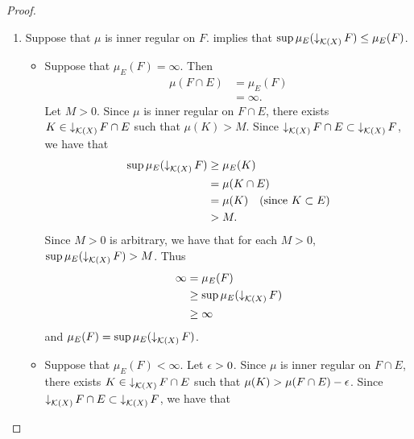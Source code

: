 \documentclass{book}
\begin{document}
\begin{proof}
\begin{enumerate}
\begin{itemize}
\begin{align*}
					& = \mu_E(U_0) \\
					& \leq \mu(U_0) \\
					& < \mu(F \cap E) + \ep \\
					& = \mu_E(F) + \ep.
				\end{align*}
				Since $\ep > 0$ is arbitrary, we have that for each $\ep > 0$, $\inf \mu_E( \upar_{\MO(X)} F) < \mu_E(F) + \ep$. Hence 
				\begin{align*}
					\inf \mu_E( \upar_{\MO(X)} F) 
					& \leq \mu_E(F) \\
					& \leq \inf \mu_E( \upar_{\MO(X)} F) 
				\end{align*}
				and $\mu_E(F) = \inf \mu_E( \upar_{\MO(X)} F)$. 
			\end{itemize}
			Thus $\mu_E$ is outer regular on $F$.
			\item Suppose that $\mu$ is inner regular on $F$.  implies that $\sup \mu_E(\operatorname{\downarrow}_{\mathcal{K}(X)}F) \leq \mu_E(F)$.
			\begin{itemize}
				\item Suppose that $\mu_E(F) = \infty$. Then 
				\begin{align*}
					\mu(F \cap E)
					& = \mu_E(F) \\
					& = \infty.
				\end{align*}
				Let $M > 0$. Since $\mu$ is inner regular on $F \cap E$, there exists $K \in \operatorname{\downarrow}_{\mathcal{K}(X)} F \cap E$ such that $\mu(K) > M$. Since $\operatorname{\downarrow}_{\mathcal{K}(X)} F \cap E \subset \operatorname{\downarrow}_{\mathcal{K}(X)} F $, we have that 
				\begin{align*}
					\sup \mu_E(\operatorname{\downarrow}_{\mathcal{K}(X)} F) 
					& \geq \mu_E(K) \\
					& = \mu(K \cap E) \\
					& = \mu(K) \quad \text{(since $K \subset E$)} \\
					& > M.
				\end{align*}
				Since $M > 0$ is arbitrary, we have that for each $M > 0$, $\sup \mu_E(\operatorname{\downarrow}_{\mathcal{K}(X)} F) > M$. Thus 
				\begin{align*}
					\infty 
					& = \mu_E(F) \\
					& \geq \sup \mu_E(\operatorname{\downarrow}_{\mathcal{K}(X)} F) \\
					& \geq \infty
				\end{align*}   
				and $\mu_E(F) = \sup \mu_E(\operatorname{\downarrow}_{\mathcal{K}(X)} F)$.
				\item Suppose that $\mu_E(F) < \infty$. Let $\ep > 0$. Since $\mu$ is inner regular on $F \cap E$, there exists $K \in \operatorname{\downarrow}_{\mathcal{K}(X)} F \cap E$ such that $\mu(K) > \mu(F \cap E) - \epsilon$. Since $\operatorname{\downarrow}_{\mathcal{K}(X)} F \cap E \subset \operatorname{\downarrow}_{\mathcal{K}(X)} F $, we have that 

\end{itemize}
\end{enumerate}
\end{proof}
\end{document}

